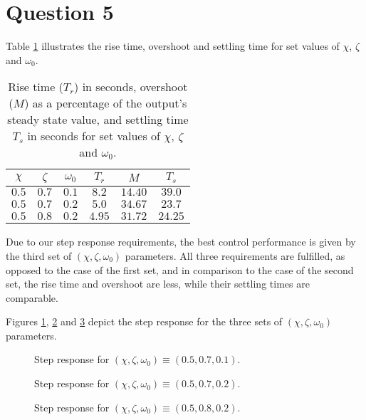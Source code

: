 \section{Question 5}

Table \ref{tbl:Q5} illustrates the rise time, overshoot and settling time for
set values of $\chi$, $\zeta$ and $\omega_0$.

\begin{table}[H]\centering
  \begin{tabular}{ccc|ccc}
  $\chi$  & $\zeta$  & $\omega_0$  & $T_r$  & $M$      & $T_s$   \\ \hline
  $0.5$   & $0.7$    & $0.1$       & $8.2$  & $14.40$  & $39.0$    \\ \hline
  $0.5$   & $0.7$    & $0.2$       & $5.0$  & $34.67$  & $23.7$  \\ \hline
  $0.5$   & $0.8$    & $0.2$       & $4.95$ & $31.72$  & $24.25$ \\ \hline
  \end{tabular}
  \caption{Rise time ($T_r$) in seconds, overshoot ($M$) as a percentage of the
    output's steady state value, and settling time $T_s$ in seconds for set
    values of $\chi$, $\zeta$ and $\omega_0$.}
  \label{tbl:Q5}
\end{table}


Due to our step response requirements, the best control performance is given by
the third set of $(\chi, \zeta, \omega_0)$ parameters. All three requirements
are fulfilled, as opposed to the case of the first set, and in comparison to the
case of the second set, the rise time and overshoot are less, while their
settling times are comparable.

Figures \ref{fig:Q5.1}, \ref{fig:Q5.2} and \ref{fig:Q5.3} depict the step
response for the three sets of $(\chi, \zeta, \omega_0)$ parameters.


\begin{figure}[H]\centering
	\centering
	\scalebox{1}{}
  \caption{Step response for $(\chi, \zeta, \omega_0) \equiv (0.5, 0.7, 0.1)$.}
  \label{fig:Q5.1}
\end{figure}

\begin{figure}[H]\centering
	\centering
	\scalebox{1}{}
  \caption{Step response for $(\chi, \zeta, \omega_0) \equiv (0.5, 0.7, 0.2)$.}
  \label{fig:Q5.2}
\end{figure}

\begin{figure}[H]\centering
	\centering
	\scalebox{1}{}
  \caption{Step response for $(\chi, \zeta, \omega_0) \equiv (0.5, 0.8, 0.2)$.}
  \label{fig:Q5.3}
\end{figure}
